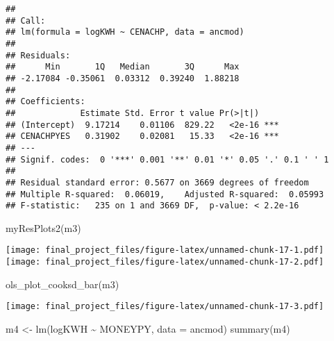 \documentclass[
]{article}
\newenvironment{Shaded}{\begin{snugshade}}{\end{snugshade}}
\newcommand{\AttributeTok}[1]{\textcolor[rgb]{0.77,0.63,0.00}{#1}}
\newcommand{\CommentTok}[1]{\textcolor[rgb]{0.56,0.35,0.01}{\textit{#1}}}
\newcommand{\FunctionTok}[1]{\textcolor[rgb]{0.00,0.00,0.00}{#1}}
\newcommand{\NormalTok}[1]{#1}
\newcommand{\OtherTok}[1]{\textcolor[rgb]{0.56,0.35,0.01}{#1}}
\newcommand{\SpecialCharTok}[1]{\textcolor[rgb]{0.00,0.00,0.00}{#1}}
\begin{document}
\begin{Shaded}
\end{Shaded}

\begin{verbatim}
## 
## Call:
## lm(formula = logKWH ~ CENACHP, data = ancmod)
## 
## Residuals:
##      Min       1Q   Median       3Q      Max 
## -2.17084 -0.35061  0.03312  0.39240  1.88218 
## 
## Coefficients:
##             Estimate Std. Error t value Pr(>|t|)    
## (Intercept)  9.17214    0.01106  829.22   <2e-16 ***
## CENACHPYES   0.31902    0.02081   15.33   <2e-16 ***
## ---
## Signif. codes:  0 '***' 0.001 '**' 0.01 '*' 0.05 '.' 0.1 ' ' 1
## 
## Residual standard error: 0.5677 on 3669 degrees of freedom
## Multiple R-squared:  0.06019,    Adjusted R-squared:  0.05993 
## F-statistic:   235 on 1 and 3669 DF,  p-value: < 2.2e-16
\end{verbatim}

\begin{Shaded}
\begin{Highlighting}[]
\FunctionTok{myResPlots2}\NormalTok{(m3)}
\end{Highlighting}
\end{Shaded}

\texttt{[image: final\_project\_files/figure-latex/unnamed-chunk-17-1.pdf]}
\texttt{[image: final\_project\_files/figure-latex/unnamed-chunk-17-2.pdf]}

\begin{Shaded}
\begin{Highlighting}[]
\FunctionTok{ols\_plot\_cooksd\_bar}\NormalTok{(m3)}
\end{Highlighting}
\end{Shaded}

\texttt{[image: final\_project\_files/figure-latex/unnamed-chunk-17-3.pdf]}

\begin{Shaded}
\begin{Highlighting}[]
\NormalTok{m4 }\OtherTok{\textless{}{-}} \FunctionTok{lm}\NormalTok{(logKWH }\SpecialCharTok{\textasciitilde{}}\NormalTok{ MONEYPY, }\AttributeTok{data =}\NormalTok{ ancmod)}
\FunctionTok{summary}\NormalTok{(m4)}
\end{Highlighting}
\end{Shaded}
\end{document}
